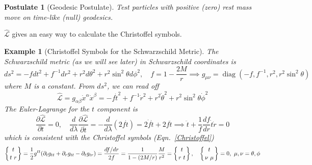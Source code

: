 \documentclass[a4paper]{article}
\DeclareMathOperator{\diag}{diag}
\newtheorem{post}{Postulate}[section]
\newtheorem{eg}{Example}[section]
\theoremstyle{new}
\begin{document}
\begin{post}[Geodesic Postulate]
Test particles with positive (zero) rest mass move on time-like (null) geodesics.
\end{post}
$\hat{\mathcal{L}}$ gives an easy way to calculate the Christoffel symbols.
\begin{eg}[Christoffel Symbols for the Schwarzschild Metric]
The Schwarzschild metric (as we will see later) in Schwarzschild coordinates is
$$ds^2=-fdt^2+f^{-1}dr^2+r^2d\theta^2+r^2\sin^2\theta d\phi^2,\quad f=1-\frac{2M}{r}\implies g_{\mu\nu}=\diag(-f,f^{-1},r^2,r^2\sin^2\theta)$$
where $M$ is a constant. From $ds^2$, we can read off 
$$\hat{\mathcal{L}}=g_{\alpha\beta}\dot{x}^\alpha\dot{x}^\beta=-f\dot{t}^2+f^{-1}\dot{r}^2+r^2\dot{\theta}^2+r^2\sin^2\theta\dot{\phi}^2$$
The Euler-Lagrange for the $t$ component is
$$\frac{\partial\hat{\mathcal{L}}}{\partial t}=0,\quad\frac{d}{d\lambda}\frac{\partial\hat{\mathcal{L}}}{\partial\dot{t}}=-\frac{d}{d\lambda}(2f\dot{t})=2\dot{f}\dot{t}+2f\ddot{t}\implies\ddot{t}+\frac{1}{f}\frac{df}{dr}\dot{t}\dot{r}=0$$
which is consistent with the Christoffel symbols (Eqn.~\ref{Christoffel})
$$\left \{ {t \atop t\ r}\right\}=\frac{1}{2}g^{tt}(\partial_tg_{tt}+\partial_rg_{tt}-\partial_tg_{tr})=\frac{df/dr}{2f}=\frac{1}{1-(2M/r)}\frac{M}{r^2}=\left \{ {t \atop r\ t}\right\},\quad\left \{ {t \atop \nu\ \mu}\right\}=0,~\mu,\nu=\theta,\phi$$
\end{eg}
\end{document}
